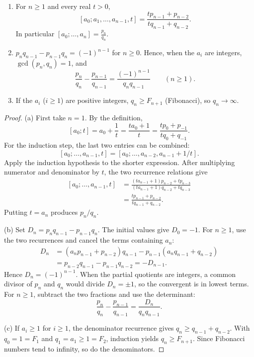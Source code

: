 \begin{proposition}\label{prop:cfconv}
\begin{enumerate}[label=(\alph*)]
\item For $n\ge1$ and every real $t>0$,
\[
[a_0;a_1,\dots,a_{n-1},t]=\frac{tp_{n-1}+p_{n-2}}{tq_{n-1}+q_{n-2}}.
\]
In particular $[a_0;\dots,a_n]=\frac{p_n}{q_n}$.
\item $p_nq_{n-1}-p_{n-1}q_n=(-1)^{n-1}$ for $n\ge0$. Hence, when the $a_i$ are integers, $\gcd(p_n,q_n)=1$, and
\[
\frac{p_n}{q_n}-\frac{p_{n-1}}{q_{n-1}}=\frac{(-1)^{n-1}}{q_nq_{n-1}}\qquad(n\ge1).
\]
\item If the $a_i$ ($i\ge1$) are positive integers, $q_n\ge F_{n+1}$ (Fibonacci), so $q_n\to\infty$.
\end{enumerate}
\end{proposition}
\begin{proof}
(a) First take $n=1$. By the definition,
\[
[a_0;t]=a_0+\frac1t
        =\frac{ta_0+1}{t}
        =\frac{tp_0+p_{-1}}{tq_0+q_{-1}}.
\]
For the induction step, the last two entries
can be combined:
\[
[a_0;\ldots,a_{n-1},t]
=[a_0;\ldots,a_{n-2},a_{n-1}+1/t].
\]
Apply the induction hypothesis to the
shorter expression. After multiplying
numerator and denominator by $t$,
the two recurrence relations give
\[
\begin{aligned}
[a_0;\ldots,a_{n-1},t]
&=\frac{(ta_{n-1}+1)p_{n-2}+tp_{n-3}}
        {(ta_{n-1}+1)q_{n-2}+tq_{n-3}}\\
&=\frac{tp_{n-1}+p_{n-2}}
        {tq_{n-1}+q_{n-2}}.
\end{aligned}
\]
Putting $t=a_n$ produces $p_n/q_n$.

(b) Set
$D_n=p_nq_{n-1}-p_{n-1}q_n$.
The initial values give $D_0=-1$.
For $n\ge1$, use the two recurrences
and cancel the terms containing $a_n$:
\[
\begin{aligned}
D_n
&=(a_np_{n-1}+p_{n-2})q_{n-1}
  -p_{n-1}(a_nq_{n-1}+q_{n-2})\\
&=p_{n-2}q_{n-1}-p_{n-1}q_{n-2}
=-D_{n-1}.
\end{aligned}
\]
Hence $D_n=(-1)^{n-1}$.
When the partial quotients are integers,
a common divisor of $p_n$ and $q_n$
would divide $D_n=\pm1$, so the
convergent is in lowest terms.
For $n\ge1$, subtract the two fractions
and use the determinant:
\[
\frac{p_n}{q_n}-\frac{p_{n-1}}{q_{n-1}}
=\frac{D_n}{q_nq_{n-1}}.
\]

(c) If $a_i\ge1$ for $i\ge1$, the
denominator recurrence gives
$q_n\ge q_{n-1}+q_{n-2}$.
With $q_0=1=F_1$ and
$q_1=a_1\ge1=F_2$, induction yields
$q_n\ge F_{n+1}$. Since Fibonacci
numbers tend to infinity,
so do the denominators.
\end{proof}

